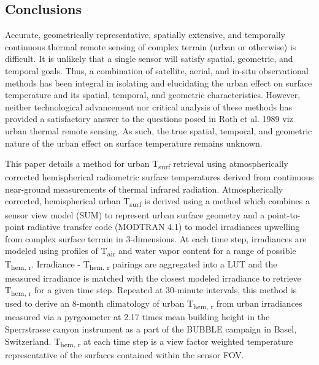 \begin{bibunit}
 \section{Conclusions}
 
Accurate, geometrically representative, spatially extensive, and temporally continuous thermal remote sensing of complex terrain (urban or otherwise) is difficult. It is unlikely that a single sensor will satisfy spatial, geometric, and temporal goals. Thus, a combination of satellite, aerial, and in-situ observational methods has been integral in isolating and elucidating the urban effect on surface temperature and its spatial, temporal, and geometric characteristics. However, neither technological advancement nor critical analysis of these methods has provided a satisfactory answer to the questions posed in Roth et al. 1989 viz urban thermal remote sensing. As such, the true spatial, temporal, and geometric nature of the urban effect on surface temperature remains unknown. 
 
This paper details a method for urban T\textsubscript{surf} retrieval using atmospherically corrected hemispherical radiometric surface temperatures derived from continuous near-ground measurements of thermal infrared radiation. Atmospherically corrected, hemispherical urban T\textsubscript{surf} is derived using a method which combines a sensor view model (SUM) to represent urban surface geometry and a point-to-point radiative transfer code (MODTRAN 4.1) to model irradiances upwelling from complex surface terrain in 3-dimensions. At each time step, irradiances are modeled using profiles of T\textsubscript{air} and water vapor content for a range of possible T\textsubscript{hem, r}. Irradiance - T\textsubscript{hem, r} pairings are aggregated into a LUT and the measured irradiance is matched with the closest modeled irradiance to retrieve T\textsubscript{hem, r} for a given time step. Repeated at 30-minute intervals, this method is used to derive an 8-month climatology of urban T\textsubscript{hem, r} from urban irradiances measured via a pyrgeometer at 2.17 times mean building height in the Sperrstrasse canyon instrument as a part of the BUBBLE campaign in Basel, Switzerland. T\textsubscript{hem, r} at each time step is a view factor weighted temperature representative of the surfaces contained within the sensor FOV.
 

\end{bibunit}

